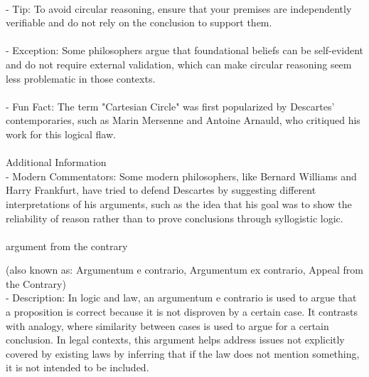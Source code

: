 \documentclass[a4paper,12pt,single,pdftex]{scrartcl}
\begin{document}
    
      
    \\

    
      - Tip: To avoid circular reasoning, ensure that your premises are independently verifiable and do not rely on the conclusion to support them.
    \\

    
      
    \\

    
      - Exception: Some philosophers argue that foundational beliefs can be self-evident and do not require external validation, which can make circular reasoning seem less problematic in those contexts.
    \\

    
      
    \\

    
      - Fun Fact: The term "Cartesian Circle" was first popularized by Descartes' contemporaries, such as Marin Mersenne and Antoine Arnauld, who critiqued his work for this logical flaw.
    \\

    
      
    \\

    
      Additional Information
    \\

    
      - Modern Commentators: Some modern philosophers, like Bernard Williams and Harry Frankfurt, have tried to defend Descartes by suggesting different interpretations of his arguments, such as the idea that his goal was to show the reliability of reason rather than to prove conclusions through syllogistic logic.
    \\

    
      
    \\

  

argument from the contrary
    
      (also known as: Argumentum e contrario, Argumentum ex contrario, Appeal from the Contrary)
    \\

  
    
      - Description: In logic and law, an argumentum e contrario is used to argue that a proposition is correct because it is not disproven by a certain case. It contrasts with analogy, where similarity between cases is used to argue for a certain conclusion. In legal contexts, this argument helps address issues not explicitly covered by existing laws by inferring that if the law does not mention something, it is not intended to be included.
    \\
\end{document}
